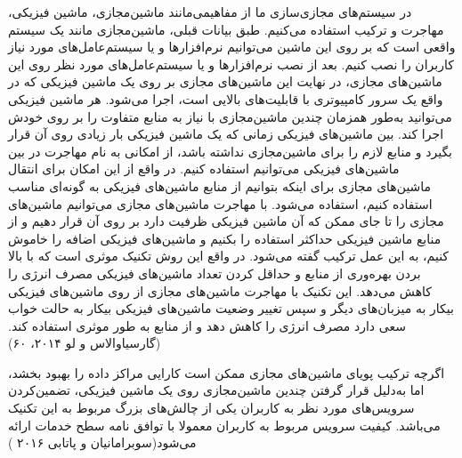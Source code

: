   در سیستم‌های مجازی‌سازی ما از مفاهیمی‌مانند ماشین‌مجازی، ماشین فیزیکی، مهاجرت و ترکیب
     استفاده می‌کنیم. طبق بیانات قبلی،  ماشین‌مجازی مانند یک سیستم واقعی است که بر روی این ماشین می‌توانیم نرم‌افزارها و یا سیستم‌عامل‌های مورد نیاز کاربران را نصب کنیم. بعد از نصب نرم‌افزارها و یا سیستم‌عامل‌های مورد نظر روی این ماشین‌های مجازی، در نهایت این ماشین‌های مجازی بر روی یک ماشین فیزیکی که در واقع یک سرور کامپیوتری با قابلیت‌های بالایی است، اجرا می‌شود. هر ماشین فیزیکی می‌توانید به‌طور همزمان چندین ماشین‌مجازی با نیاز به منابع متفاوت را بر روی خودش اجرا کند. بین ماشین‌های فیزیکی زمانی که یک ماشین فیزیکی بار زیادی روی آن قرار بگیرد و منابع لازم را برای ماشین‌مجازی نداشته باشد، از امکانی به نام مهاجرت در بین ماشین‌های فیزیکی می‌توانیم استفاده کنیم. در واقع از این امکان برای انتقال ماشین‌های مجازی برای اینکه بتوانیم از منابع ماشین‌های فیزیکی به گونه‌ای مناسب استفاده کنیم، استفاده می‌شود. با مهاجرت ماشین‌های مجازی می‌توانیم ماشین‌های مجازی را تا جای ممکن که آن ماشین فیزیکی ظرفیت دارد بر روی آن قرار دهیم و از منابع ماشین فیزیکی حداکثر استفاده را بکنیم و ماشین‌های فیزیکی اضافه را خاموش کنیم، به این عمل ترکیب گفته می‌شود. در واقع این روش تکنیک موثری است که با بالا بردن بهره‌وری از منابع و حداقل کردن تعداد ماشین‌های فیزیکی مصرف انرژی را کاهش می‌دهد. این تکنیک با مهاجرت ماشین‌های مجازی از روی ماشین‌های فیزیکی بیکار به میزبان‌های دیگر و سپس تغییر وضعیت ماشین‌های فیزیکی بیکار به حالت خواب سعی دارد مصرف انرژی را کاهش دهد و از منابع به طور موثری استفاده کند.
     (گارسیاوالاس و لو
      ۲۰۱۴، ۶۰)
   
  
  اگرچه ترکیب پویای ماشین‌های مجازی ممکن است کارایی مراکز داده را بهبود بخشد، 
  اما به‌دلیل قرار گرفتن چندین ماشین‌مجازی روی یک ماشین فیزیکی، تضمین‌کردن سرویس‌های مورد نظر به کاربران یکی از چالش‌های بزرگ مربوط به این تکنیک می‌باشد. کیفیت سرویس مربوط به کاربران معمولا با توافق نامه سطح خدمات
    ارائه می‌شود(سوبرامانیان و پاتابی
     ۲۰۱۶ )

